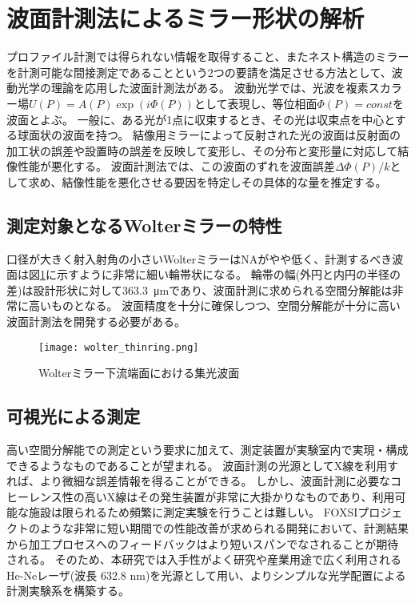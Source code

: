\section{波面計測法によるミラー形状の解析}
\label{chap1_wave_metrics}

プロファイル計測では得られない情報を取得すること、またネスト構造のミラーを計測可能な間接測定であることという2つの要請を満足させる方法として、波動光学の理論を応用した波面計測法がある。
波動光学では、光波を複素スカラー場$U(P)=A(P)\exp(i\Phi(P))$として表現し、等位相面$\Phi(P)=const$を波面とよぶ。
一般に、ある光が1点に収束するとき、その光は収束点を中心とする球面状の波面を持つ。
結像用ミラーによって反射された光の波面は反射面の加工状の誤差や設置時の誤差を反映して変形し、その分布と変形量に対応して結像性能が悪化する。
波面計測法では、この波面のずれを波面誤差$\Delta\Phi(P)/k$として求め、結像性能を悪化させる要因を特定しその具体的な量を推定する。

\subsection{測定対象となるWolterミラーの特性}
\label{chap1_wolter_specific_feature}

口径が大きく射入射角の小さいWolterミラーはNAがやや低く、計測するべき波面は図\ref{fig:wolter_thinring}に示すように非常に細い輪帯状になる。
輪帯の幅(外円と内円の半径の差)は設計形状に対して\SI{363.3}{\micro \metre}であり、波面計測に求められる空間分解能は非常に高いものとなる。
波面精度を十分に確保しつつ、空間分解能が十分に高い波面計測法を開発する必要がある。

\begin{figure}[h!]
\centering
\texttt{[image: wolter\_thinring.png]}
\caption{Wolterミラー下流端面における集光波面}
\label{fig:wolter_thinring}
\end{figure}

\subsection{可視光による測定}
\label{chap1_visible_light_measurement}

高い空間分解能での測定という要求に加えて、測定装置が実験室内で実現・構成できるようなものであることが望まれる。
波面計測の光源としてX線を利用すれば、より微細な誤差情報を得ることができる。
しかし、波面計測に必要なコヒーレンス性の高いX線はその発生装置が非常に大掛かりなものであり、利用可能な施設は限られるため頻繁に測定実験を行うことは難しい。
FOXSIプロジェクトのような非常に短い期間での性能改善が求められる開発において、計測結果から加工プロセスへのフィードバックはより短いスパンでなされることが期待される。
そのため、本研究では入手性がよく研究や産業用途で広く利用されるHe-Neレーザ(波長 632.8 nm)を光源として用い、よりシンプルな光学配置による計測実験系を構築する。

